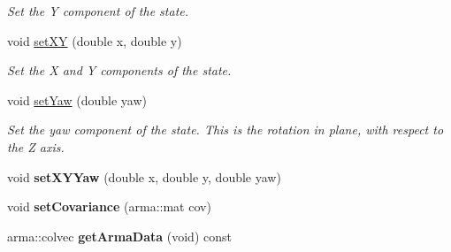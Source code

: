 \begin{DoxyCompactItemize}
\begin{DoxyCompactList}\small\item\em \-Set the \-Y component of the state. \end{DoxyCompactList}\item 
\hypertarget{class_s_e2_belief_space_1_1_state_type_aba839217241393594cacff450a61cc56}{void \hyperlink{class_s_e2_belief_space_1_1_state_type_aba839217241393594cacff450a61cc56}{set\-X\-Y} (double x, double y)}\label{class_s_e2_belief_space_1_1_state_type_aba839217241393594cacff450a61cc56}

\begin{DoxyCompactList}\small\item\em \-Set the \-X and \-Y components of the state. \end{DoxyCompactList}\item 
\hypertarget{class_s_e2_belief_space_1_1_state_type_a86f79402419f759c39ee3d6bfd7b375f}{void \hyperlink{class_s_e2_belief_space_1_1_state_type_a86f79402419f759c39ee3d6bfd7b375f}{set\-Yaw} (double yaw)}\label{class_s_e2_belief_space_1_1_state_type_a86f79402419f759c39ee3d6bfd7b375f}

\begin{DoxyCompactList}\small\item\em \-Set the yaw component of the state. \-This is the rotation in plane, with respect to the \-Z axis. \end{DoxyCompactList}\item 
\hypertarget{class_s_e2_belief_space_1_1_state_type_af6e888798cdd76ae3ae56c23e6d14bca}{void {\bfseries set\-X\-Y\-Yaw} (double x, double y, double yaw)}\label{class_s_e2_belief_space_1_1_state_type_af6e888798cdd76ae3ae56c23e6d14bca}

\item 
\hypertarget{class_s_e2_belief_space_1_1_state_type_a5fee8a9eb77fd9ee5b7a7e889adf0602}{void {\bfseries set\-Covariance} (arma\-::mat cov)}\label{class_s_e2_belief_space_1_1_state_type_a5fee8a9eb77fd9ee5b7a7e889adf0602}

\item 
\hypertarget{class_s_e2_belief_space_1_1_state_type_a7514b225050bf07ab431a25371af3f1c}{arma\-::colvec {\bfseries get\-Arma\-Data} (void) const }\label{class_s_e2_belief_space_1_1_state_type_a7514b225050bf07ab431a25371af3f1c}

\end{DoxyCompactItemize}
